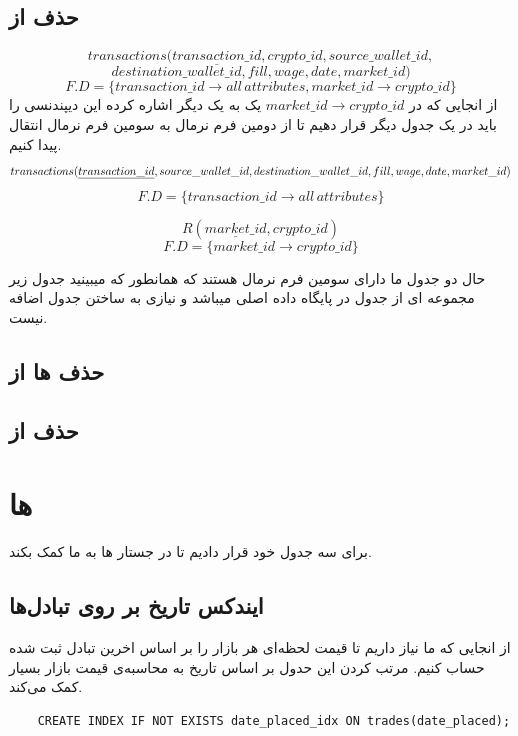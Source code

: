 \documentclass{book}
\begin{document}
\subsection{حذف  از }
$$transactions(\underline{transaction\_id}, crypto\_id, source\_wallet\_id,$$
$$destination\_wallet\_id, fill, wage, date,market\_id)$$
$$F.D = \{transaction\_id \rightarrow all\,attributes , market\_id \rightarrow crypto\_id\}$$
از انجایی که در $market\_id \rightarrow crypto\_id$ یک  به یک  دیگر اشاره کرده این دیپندنسی را باید در یک جدول دیگر قرار دهیم تا از دومین فرم نرمال به سومین فرم نرمال انتقال پیدا کنیم.
$$transactions(\underline{transaction\_id}, source\_wallet\_id,\newline
    destination\_wallet\_id, fill, wage, date,market\_id)$$
$$F.D = \{transaction\_id \rightarrow all\,attributes \}$$

$$R(\underline{market\_id}, crypto\_id)$$
$$F.D = \{market\_id \rightarrow crypto\_id\}$$

حال دو جدول ما دارای سومین فرم نرمال هستند که همانطور که میبینید جدول  زیر مجموعه ای از جدول  در پایگاه داده اصلی میباشد و نیازی به ساختن جدول اضافه نیست.


\subsection{حذف  ها از }
\subsection{حذف  از }
\section{ها}
برای سه جدول خود  قرار دادیم تا در جستار ها به ما کمک بکند.
\subsection{ایندکس تاریخ بر روی تبادل‌ها}
از انجایی که ما نیاز داریم تا قیمت لحظه‌ای هر بازار را بر اساس اخرین تبادل ثبت شده حساب کنیم. مرتب کردن این حدول بر اساس تاریخ به محاسبه‌ی قیمت بازار بسیار کمک می‌کند.

\begin{latin}
    \begin{verbatim}
    CREATE INDEX IF NOT EXISTS date_placed_idx ON trades(date_placed);
    \end{verbatim}
\end{latin}
\end{document}
